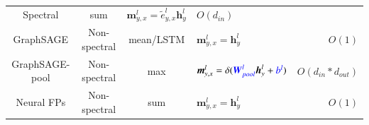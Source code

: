 \begin{table}[H]
\begin{footnotesize}
\begin{tabular}{cccp{22em}r}
            Spectral                                                                                                                  &
            sum                                                                                                                       &
            $\boldsymbol{m}^l_{y, x} = \tilde{e}^l_{y, x} \boldsymbol{h}^l_y$                                                         &
            $O(d_{in})$                                                                                                                 \\
            GraphSAGE \cite{hamilton2017_graphsage}                                                                                   &
            Non-spectral                                                                                                              &
            mean/LSTM                                                                                                                 &
            $\boldsymbol{m}_{y, x}^l =  \boldsymbol{h}_y^l$                                                                           &
            $O(1)$                                                                                                                      \\
            GraphSAGE-pool \cite{hamilton2017_graphsage}                                                                              &
            Non-spectral                                                                                                              &
            max                                                                                                                       &
            $\boldsymbol{m}_{y, x}^l =  \delta(\textcolor{blue}{\boldsymbol{W}^l_{pool}} \boldsymbol{h}_y^l + \textcolor{blue}{b^l})$ &
            $O(d_{in} * d_{out})$                                                                                                       \\
            Neural FPs  \cite{duvenaud2015_neural_fps}                                                                                &
            Non-spectral                                                                                                              &
            sum                                                                                                                       &
            $\boldsymbol{m}_{y, x}^l = \boldsymbol{h}_y^l$                                                                            &
            $O(1)$                                                                                                                      \\

\end{tabular}
\end{footnotesize}
\end{table}
